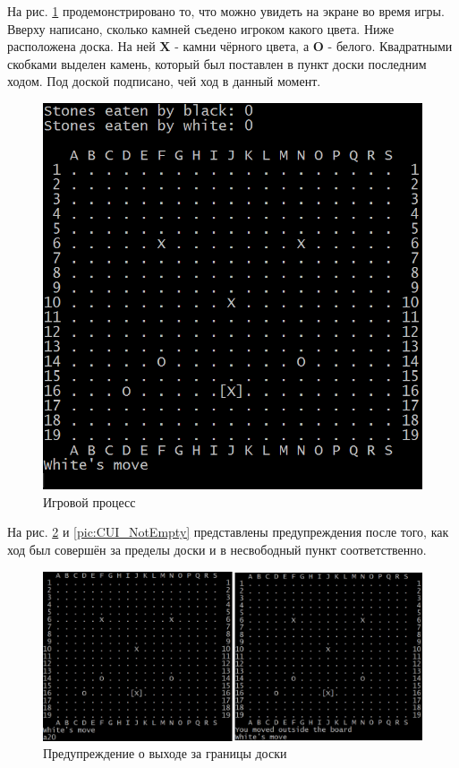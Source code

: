 На рис. \ref{pic:CUI_Process} продемонстрировано то, что можно увидеть на экране во время игры. Вверху написано, сколько камней съедено игроком какого цвета. Ниже расположена доска. На ней \textbf{X} - камни чёрного цвета, а \textbf{O} - белого. Квадратными скобками выделен камень, который был поставлен в пункт доски последним ходом. Под доской подписано, чей ход в данный момент.

\begin{figure}[H]
	\begin{center}
		\includegraphics[scale=0.6]{pics/GoCUI/Process.png}
	    \caption{Игровой процесс} 
		\label{pic:CUI_Process}
	\end{center}
\end{figure}

На рис. \ref{pic:CUI_Out} и \ref{pic:CUI_NotEmpty} представлены предупреждения после того, как ход был совершён за пределы доски и в несвободный пункт соответственно.

\begin{figure}[H]
	\begin{center}
		\includegraphics[scale=0.6]{pics/GoCUI/Out.png}
	    \caption{Предупреждение о выходе за границы доски} 
		\label{pic:CUI_Out}
	\end{center}
\end{figure}


